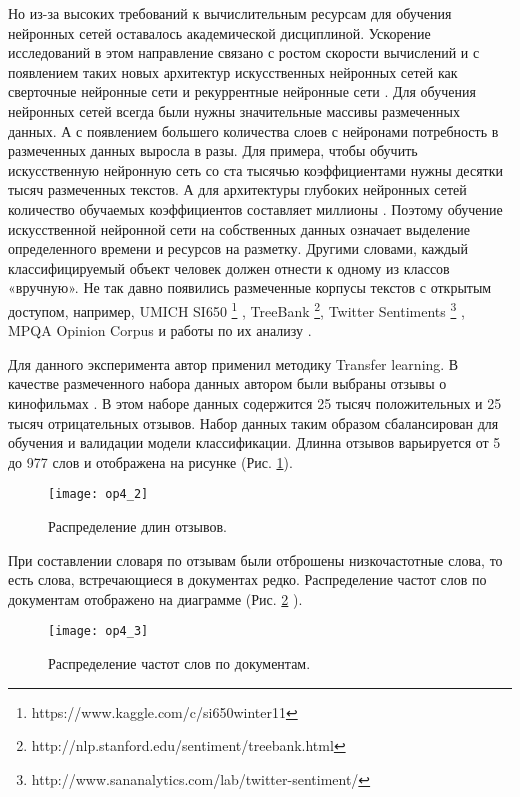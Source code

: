 Но из-за высоких требований к вычислительным ресурсам для обучения нейронных сетей оставалось академической дисциплиной.
Ускорение исследований в этом направление связано с ростом скорости вычислений и с появлением таких новых архитектур искусственных нейронных сетей как сверточные нейронные сети \cite{kim2014convolutional} и рекуррентные нейронные сети \cite{mikolov2010recurrent}.
Для обучения нейронных сетей всегда были нужны значительные массивы размеченных данных.
А с появлением большего количества слоев с нейронами потребность в размеченных данных выросла в разы. 
Для примера, чтобы обучить искусственную нейронную сеть со ста тысячью коэффициентами нужны десятки тысяч размеченных текстов. 
А для архитектуры глубоких нейронных сетей количество обучаемых коэффициентов составляет миллионы \cite{krizhevsky2012imagenet,miller1995wordnet}.
Поэтому обучение искусственной нейронной сети на собственных данных означает выделение определенного времени и ресурсов на разметку. 
Другими словами, каждый классифицируемый объект человек должен отнести к одному из классов «вручную».
Не так давно появились размеченные корпусы текстов с открытым доступом, например,
UMICH SI650 \footnote{https://www.kaggle.com/c/si650winter11} , TreeBank \footnote{http://nlp.stanford.edu/sentiment/treebank.html}, 
Twitter Sentiments \footnote{http://www.sananalytics.com/lab/twitter-sentiment/} , MPQA Opinion Corpus \cite{http://mpqa.cs.pitt.edu} и работы по их анализу \cite{maas2011learning,socher2013recursive, akkaya2009subjectivity}.

Для данного эксперимента автор применил методику Transfer learning.
В качестве размеченного набора данных автором были выбраны отзывы о кинофильмах \cite{maas2011learning}. 
В этом наборе данных содержится 25 тысяч положительных и 25 тысяч отрицательных отзывов. 
Набор данных таким образом сбалансирован для обучения и валидации модели классификации.
Длинна отзывов варьируется от 5 до 977 слов и отображена на рисунке (Рис. \ref{fig:op4_2}).
\begin{figure}[ht]
	\centering
	\texttt{[image: op4\_2]}
	\caption{Распределение длин отзывов.}
	\label{fig:op4_2}
\end{figure}

При составлении словаря по отзывам были отброшены низкочастотные слова, то есть слова, встречающиеся в документах редко. Распределение частот слов по документам отображено на диаграмме (Рис. \ref{fig:op4_3} ).
\begin{figure}[ht]
  \centering
  \texttt{[image: op4\_3]}
  \caption{Распределение частот слов по документам.}
  \label{fig:op4_3}
\end{figure}

